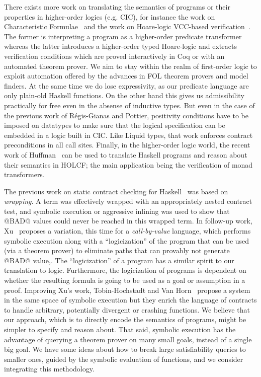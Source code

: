 There exists more work on translating the semantics of programs or their properties in 
higher-order logics (e.g. CIC), for instance the work on Characteristic Formulae~\cite{char-form} 
and the work on Hoare-logic VCC-based verification~\cite{regis-gianas-pottier-08}. The former
is interpreting a program as a higher-order predicate transformer
whereas the latter introduces a higher-order typed Hoare-logic and
extracts verification conditions which are proved interactively in Coq or with 
an automated theorem prover. We aim to stay within the realm of
first-order logic to exploit automation offered by the advances in FOL
theorem provers and model finders. At the same time we do lose
expressivity, as our predicate language are only plain-old Haskell
functions. On the other hand this gives us
admissibility practically for free even in the absense of inductive
types. But even in the case of the previous work of
R\'{e}gis-Gianas and Pottier, positivity conditions have to be imposed on
datatypes to make sure that the logical specification can be embedded
in a logic built in CIC. Like Liquid types, that work enforces contract
preconditions in all call sites. Finally, in the higher-order logic world, the 
recent work of Huffman~\cite{Huffman:2012:FVM:2364527.2364532} can be used to 
translate Haskell programs and reason about their semantics in HOLCF; the main 
application being the verification of monad transformers.

The previous work on static contract checking for Haskell~\cite{xu+:contracts}
was based on {\em wrapping}. A term was effectively wrapped
with an appropriately nested contract test, and symbolic execution or 
aggressive inlining was used to show that @BAD@ values could
never be reached in this wrapped term.
In follow-up work, Xu~\cite{Xu:2012:HCC:2103746.2103767} proposes a variation, this time for a
{\em call-by-value} language, which performs symbolic execution along with
a ``logicization'' of the program that can be used (via a theorem prover)
to eliminate paths that can
provably not generate @BAD@ value,. The ``logicization'' of a
program has a similar spirit to our translation to logic.
Furthermore, the logicization of programs is dependent on whether
the resulting formula is going to be used as a goal or assumption in a proof. 
Improving Xu's work, Tobin-Hochstadt and Van Horn~\cite{hochstadt-horn} propose
a system in the same space of symbolic execution but they enrich the 
language of contracts to handle arbitrary, potentially divergent or crashing functions.
We believe that our approach, which is to directly 
encode the semantics of programs, might be simpler to specify and reason about.
That said, symbolic execution has the advantage of querying a
theorem prover on many small goals, instead of a
single big goal. We have some ideas about how to break large
satisfiability queries to smaller ones, guided by the symbolic 
evaluation of functions, and we consider integrating this methodology.

